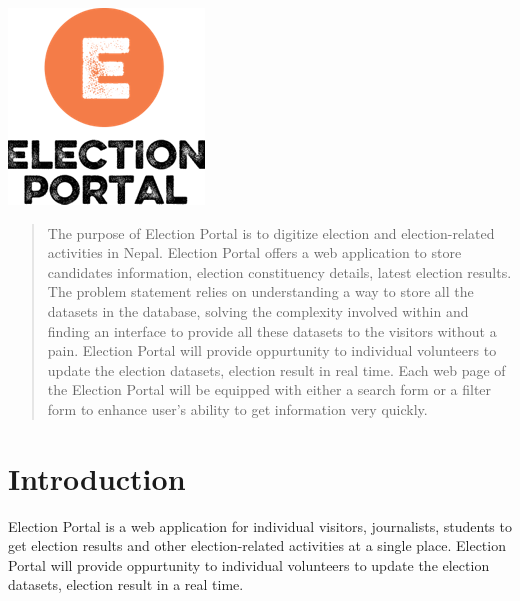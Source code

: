 \documentclass[12pt]{article}
\begin{document}
\begin{titlepage}

\includegraphics[scale=0.4]{logo.png}\\[1cm] %
 

\vfill %

\end{titlepage}


\begin{abstract}
The purpose of Election Portal is to digitize election and election-related activities in Nepal.
Election Portal offers a web application to store candidates information, election constituency details,
latest election results. The problem statement relies on understanding a
way to store all the datasets in the database, solving the complexity involved within and finding an interface to provide all these datasets to the visitors without a pain. Election Portal will provide oppurtunity to individual volunteers to update the election datasets, election result in real time. Each web page of the Election Portal will be equipped with either a search form or a filter form to enhance user's ability to get information very quickly.
\end{abstract}

\section{Introduction}

Election Portal is a web application for individual visitors, journalists, students to get election results and other election-related activities at a single place. Election Portal will provide oppurtunity to individual volunteers to update the election datasets, election result in a real time.
\end{document}

